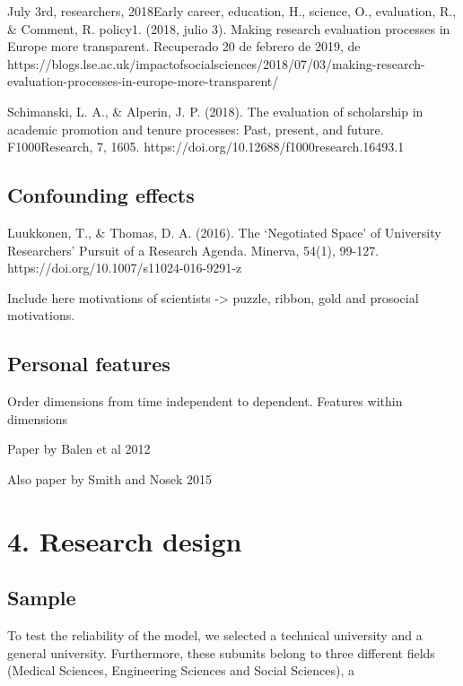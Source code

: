 \documentclass[]{elsarticle} %
\begin{document}
July 3rd, researchers, 2018\textbar{}Early career, education, H.,
science, O., evaluation, R., \& Comment, R. policy\textbar{}1. (2018,
julio 3). Making research evaluation processes in Europe more
transparent. Recuperado 20 de febrero de 2019, de
https://blogs.lse.ac.uk/impactofsocialsciences/2018/07/03/making-research-evaluation-processes-in-europe-more-transparent/

Schimanski, L. A., \& Alperin, J. P. (2018). The evaluation of
scholarship in academic promotion and tenure processes: Past, present,
and future. F1000Research, 7, 1605.
https://doi.org/10.12688/f1000research.16493.1

\hypertarget{confounding-effects}{%
\subsection{Confounding effects}\label{confounding-effects}}

Luukkonen, T., \& Thomas, D. A. (2016). The `Negotiated Space' of
University Researchers' Pursuit of a Research Agenda. Minerva, 54(1),
99-127. https://doi.org/10.1007/s11024-016-9291-z

Include here motivations of scientists -\textgreater{} puzzle, ribbon,
gold and prosocial motivations.

\hypertarget{personal-features}{%
\subsection{Personal features}\label{personal-features}}

Order dimensions from time independent to dependent. Features within
dimensions

Paper by Balen et al 2012

Also paper by Smith and Nosek 2015

\hypertarget{research-design}{%
\section{4. Research design}\label{research-design}}

\hypertarget{sample}{%
\subsection{Sample}\label{sample}}

To test the reliability of the model, we selected a technical university
and a general university. Furthermore, these subunits belong to three
different fields (Medical Sciences, Engineering Sciences and Social
Sciences), a
\end{document}
